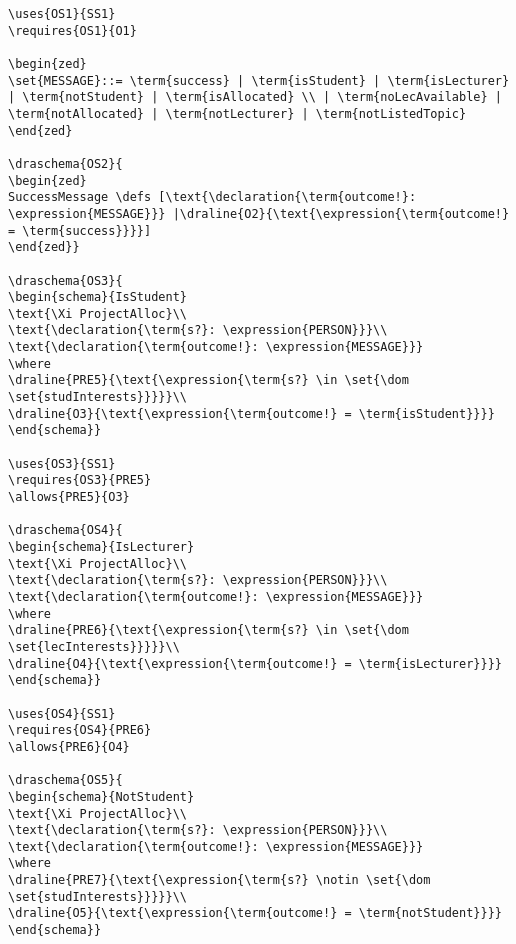 \begin{verbatim}
\uses{OS1}{SS1}
\requires{OS1}{O1}

\begin{zed}
\set{MESSAGE}::= \term{success} | \term{isStudent} | \term{isLecturer} | \term{notStudent} | \term{isAllocated} \\ | \term{noLecAvailable} | \term{notAllocated} | \term{notLecturer} | \term{notListedTopic}
\end{zed}

\draschema{OS2}{
\begin{zed}
SuccessMessage \defs [\text{\declaration{\term{outcome!}: \expression{MESSAGE}}} |\draline{O2}{\text{\expression{\term{outcome!} = \term{success}}}}]
\end{zed}}

\draschema{OS3}{
\begin{schema}{IsStudent}
\text{\Xi ProjectAlloc}\\
\text{\declaration{\term{s?}: \expression{PERSON}}}\\
\text{\declaration{\term{outcome!}: \expression{MESSAGE}}}
\where
\draline{PRE5}{\text{\expression{\term{s?} \in \set{\dom \set{studInterests}}}}}\\
\draline{O3}{\text{\expression{\term{outcome!} = \term{isStudent}}}}
\end{schema}}

\uses{OS3}{SS1}
\requires{OS3}{PRE5}
\allows{PRE5}{O3}

\draschema{OS4}{
\begin{schema}{IsLecturer}
\text{\Xi ProjectAlloc}\\
\text{\declaration{\term{s?}: \expression{PERSON}}}\\
\text{\declaration{\term{outcome!}: \expression{MESSAGE}}}
\where
\draline{PRE6}{\text{\expression{\term{s?} \in \set{\dom \set{lecInterests}}}}}\\
\draline{O4}{\text{\expression{\term{outcome!} = \term{isLecturer}}}}
\end{schema}}

\uses{OS4}{SS1}
\requires{OS4}{PRE6}
\allows{PRE6}{O4}

\draschema{OS5}{
\begin{schema}{NotStudent}
\text{\Xi ProjectAlloc}\\
\text{\declaration{\term{s?}: \expression{PERSON}}}\\
\text{\declaration{\term{outcome!}: \expression{MESSAGE}}}
\where
\draline{PRE7}{\text{\expression{\term{s?} \notin \set{\dom \set{studInterests}}}}}\\
\draline{O5}{\text{\expression{\term{outcome!} = \term{notStudent}}}}
\end{schema}}


\end{verbatim}
